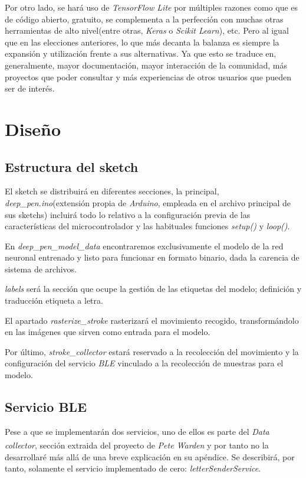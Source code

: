 Por otro lado, se hará uso de \textit{TensorFlow Lite} por múltiples razones
como que es de código abierto, gratuito, se complementa a la perfección con
muchas otras herramientas de alto nivel(entre otras, \textit{Keras} o \textit{Scikit Learn}),
etc. Pero al igual que en las elecciones anteriores, lo que más decanta la balanza
es siempre la expansión y utilización frente a sus alternativas. Ya que esto se
traduce en, generalmente, mayor documentación, mayor interacción de la comunidad,
más proyectos que poder consultar y más experiencias de otros usuarios que pueden
ser de interés.


\section{Diseño}
\subsection{Estructura del sketch}
El sketch se distribuirá en diferentes secciones, la principal,
\textit{deep\_pen.ino}(extensión propia de \textit{Arduino}, empleada en
el archivo principal de sus sketchs) incluirá todo lo relativo a la
configuración previa de las características del microcontrolador y las
habituales funciones \textit{setup()} y \textit{loop()}.

En \textit{deep\_pen\_model\_data} encontraremos exclusivamente el modelo
de la red neuronal entrenado y listo para funcionar en formato binario,
dada la carencia de sistema de archivos.

\textit{labels} será la sección que ocupe la gestión de las etiquetas del
modelo; definición y traducción etiqueta a letra.

El apartado \textit{rasterize\_stroke} rasterizará el movimiento recogido,
transformándolo en las imágenes que sirven como entrada para el modelo.

Por último, \textit{stroke\_collector} estará reservado a la recolección
del movimiento y la configuración del servicio \textit{BLE} vinculado
a la recolección de muestras para el modelo.
\newpage

\subsection{Servicio BLE}
Pese a que se implementarán dos servicios, uno de ellos es parte del \textit{Data collector},
sección extraida del proyecto de \textit{Pete Warden}\textsuperscript{\cite{petewardenmw}}
y por tanto no la desarrollaré más allá de una breve explicación en su apéndice.
Se describirá, por tanto, solamente el servicio implementado de cero:
\textit{letterSenderService}.

